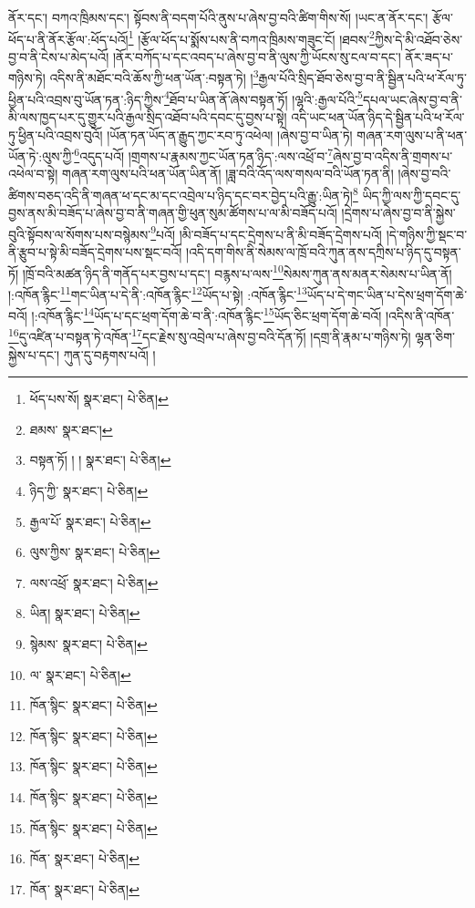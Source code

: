 ནོར་དང་། བཀའ་ཁྲིམས་དང་། སྟོབས་ནི་བདག་པོའི་ནུས་པ་ཞེས་བྱ་བའི་ཚིག་གིས་སོ། །ཡང་ན་ནོར་དང་། རྩོལ་ཕོད་པ་ནི་ནོར་རྩོལ་:ཕོད་པའོ།\footnote{ཕོད་པས་སོ།  སྣར་ཐང་།  པེ་ཅིན། } །རྩོལ་ཕོད་པ་སྨོས་པས་ནི་བཀའ་ཁྲིམས་གཟུང་ངོ། །ཐབས་\footnote{ཐམས་  སྣར་ཐང་། }ཀྱིས་དེ་མི་འཐོབ་ཅེས་བྱ་བ་ནི་ངེས་པ་མེད་པའོ། །ནོར་བཀོད་པ་དང་འབད་པ་ཞེས་བྱ་བ་ནི་ལུས་ཀྱི་ཡོངས་སུ་ངལ་བ་དང་། ནོར་ཟད་པ་གཉིས་ཏེ། འདིས་ནི་མཐོང་བའི་ཆོས་ཀྱི་ཕན་ཡོན་:བསྟན་ཏེ། །\footnote{བསྟན་ཏོ། ། །  སྣར་ཐང་།  པེ་ཅིན། }རྒྱལ་པོའི་སྲིད་ཐོབ་ཅེས་བྱ་བ་ནི་སྦྱིན་པའི་ཕ་རོལ་ཏུ་ཕྱིན་པའི་འབྲས་བུ་ཡོན་ཏན་:ཉིད་ཀྱིས་\footnote{ཉིད་ཀྱི་  སྣར་ཐང་།  པེ་ཅིན། }ཐོབ་པ་ཡིན་ནོ་ཞེས་བསྟན་ཏོ། །ལྷའི་:རྒྱལ་པོའི་\footnote{རྒྱལ་པོ་  སྣར་ཐང་།  པེ་ཅིན། }དཔལ་ཡང་ཞེས་བྱ་བ་ནི་མི་ལས་ཁྱད་པར་དུ་གྱུར་པའི་རྒྱལ་སྲིད་འཐོབ་པའི་དབང་དུ་བྱས་པ་སྟེ། འདི་ཡང་ཕན་ཡོན་ཉིད་དེ་སྦྱིན་པའི་ཕ་རོལ་ཏུ་ཕྱིན་པའི་འབྲས་བུའོ། །ཡོན་ཏན་ཡོད་ན་རྒྱུད་ཀྱང་རབ་ཏུ་འཕེལ། །ཞེས་བྱ་བ་ཡིན་ཏེ། གཞན་རག་ལུས་པ་ནི་ཕན་ཡོན་ཏེ་:ལུས་ཀྱི་\footnote{ལུས་ཀྱིས་  སྣར་ཐང་།  པེ་ཅིན། }འདུད་པའོ། །གྲགས་པ་རྣམས་ཀྱང་ཡོན་ཏན་ཉིད་:ལས་འཕྲོ་བ་\footnote{ལས་འཕྲོ་  སྣར་ཐང་།  པེ་ཅིན། }ཞེས་བྱ་བ་འདིས་ནི་གྲགས་པ་འཕེལ་བ་སྟེ། གཞན་རག་ལུས་པའི་ཕན་ཡོན་ཡིན་ནོ། །ཟླ་བའི་འོད་ལས་གསལ་བའི་ཡོན་ཏན་ནི། །ཞེས་བྱ་བའི་ཚིགས་བཅད་འདི་ནི་གཞན་ཕ་དང་མ་དང་འབྲེལ་པ་ཉིད་དང་བར་བྱེད་པའི་རྒྱུ་:ཡིན་ཏེ།\footnote{ཡིན།  སྣར་ཐང་།  པེ་ཅིན། } ཡིད་ཀྱི་ལས་ཀྱི་དབང་དུ་བྱས་ནས་མི་བཟོད་པ་ཞེས་བྱ་བ་ནི་གཞན་གྱི་ཕུན་སུམ་ཚོགས་པ་ལ་མི་བཟོད་པའོ། །དྲེགས་པ་ཞེས་བྱ་བ་ནི་སྐྱེས་བུའི་སྟོབས་ལ་སོགས་པས་བསྙེམས་\footnote{སྙེམས་  སྣར་ཐང་།  པེ་ཅིན། }པའོ། །མི་བཟོད་པ་དང་དྲེགས་པ་ནི་མི་བཟོད་དྲེགས་པའོ། །དེ་གཉིས་ཀྱི་སྡང་བ་ནི་རྩུབ་པ་སྟེ་མི་བཟོད་དྲེགས་པས་སྡང་བའོ། །འདི་དག་གིས་ནི་སེམས་ལ་ཁྲོ་བའི་ཀུན་ནས་དཀྲིས་པ་ཉིད་དུ་བསྟན་ཏོ། །ཁྲོ་བའི་མཚན་ཉིད་ནི་གནོད་པར་བྱས་པ་དང་། བརྙས་པ་ལས་\footnote{ལ་  སྣར་ཐང་།  པེ་ཅིན། }སེམས་ཀུན་ནས་མནར་སེམས་པ་ཡིན་ནོ། །:འཁོན་རྙིང་\footnote{ཁོན་སྙིང་  སྣར་ཐང་།  པེ་ཅིན། }གང་ཡིན་པ་དེ་ནི་:འཁོན་རྙིང་\footnote{ཁོན་སྙིང་  སྣར་ཐང་།  པེ་ཅིན། }ཡོད་པ་སྟེ། :འཁོན་རྙིང་\footnote{ཁོན་སྙིང་  སྣར་ཐང་།  པེ་ཅིན། }ཡོད་པ་དེ་གང་ཡིན་པ་དེས་ཕྲག་དོག་ཆེ་བའོ། །:འཁོན་རྙིང་\footnote{ཁོན་སྙིང་  སྣར་ཐང་།  པེ་ཅིན། }ཡོད་པ་དང་ཕྲག་དོག་ཆེ་བ་ནི་:འཁོན་རྙིང་\footnote{ཁོན་སྙིང་  སྣར་ཐང་།  པེ་ཅིན། }ཡོད་ཅིང་ཕྲག་དོག་ཆེ་བའོ། །འདིས་ནི་འཁོན་\footnote{ཁོན་  སྣར་ཐང་།  པེ་ཅིན། }དུ་འཛིན་པ་བསྟན་ཏེ་འཁོན་\footnote{ཁོན་  སྣར་ཐང་།  པེ་ཅིན། }དང་རྗེས་སུ་འབྲེལ་པ་ཞེས་བྱ་བའི་དོན་ཏོ། །དགྲ་ནི་རྣམ་པ་གཉིས་ཏེ། ལྷན་ཅིག་སྐྱེས་པ་དང་། ཀུན་དུ་བརྟགས་པའོ། །
